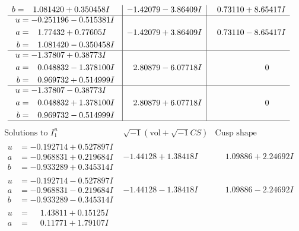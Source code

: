 \documentclass[1p]{elsarticle_modified}
\theoremstyle{definition}
\newcommand{\I}{\sqrt{-1}}
\begin{document}
$$\begin{array}{c|c|c}
\begin{aligned}
b &= \phantom{-}1.081420 + 0.350458 I\end{aligned}
 & -1.42079 - 3.86409 I & \phantom{-}0.73110 + 8.65417 I \\ \hline\begin{aligned}
u &= -0.251196 - 0.515381 I \\
a &= \phantom{-}1.77432 + 0.77605 I \\
b &= \phantom{-}1.081420 - 0.350458 I\end{aligned}
 & -1.42079 + 3.86409 I & \phantom{-}0.73110 - 8.65417 I \\ \hline\begin{aligned}
u &= -1.37807 + 0.38773 I \\
a &= \phantom{-}0.048832 - 1.378100 I \\
b &= \phantom{-}0.969732 + 0.514999 I\end{aligned}
 & \phantom{-}2.80879 - 6.07718 I & \phantom{-0.000000 } 0 \\ \hline\begin{aligned}
u &= -1.37807 - 0.38773 I \\
a &= \phantom{-}0.048832 + 1.378100 I \\
b &= \phantom{-}0.969732 - 0.514999 I\end{aligned}
 & \phantom{-}2.80879 + 6.07718 I & \phantom{-0.000000 } 0\\
 \hline 
 \end{array}$$\newpage$$\begin{array}{c|c|c}  
\text{Solutions to }I^u_{1}& \I (\text{vol} + \sqrt{-1}CS) & \text{Cusp shape}\\
 \hline 
\begin{aligned}
u &= -0.192714 + 0.527897 I \\
a &= -0.968831 + 0.219684 I \\
b &= -0.933289 + 0.345314 I\end{aligned}
 & -1.44128 + 1.38418 I & \phantom{-}1.09886 + 2.24692 I \\ \hline\begin{aligned}
u &= -0.192714 - 0.527897 I \\
a &= -0.968831 - 0.219684 I \\
b &= -0.933289 - 0.345314 I\end{aligned}
 & -1.44128 - 1.38418 I & \phantom{-}1.09886 - 2.24692 I \\ \hline\begin{aligned}
u &= \phantom{-}1.43811 + 0.15125 I \\
a &= \phantom{-}0.11771 + 1.79107 I \\

\end{aligned}
\end{array}$$
\end{document}
